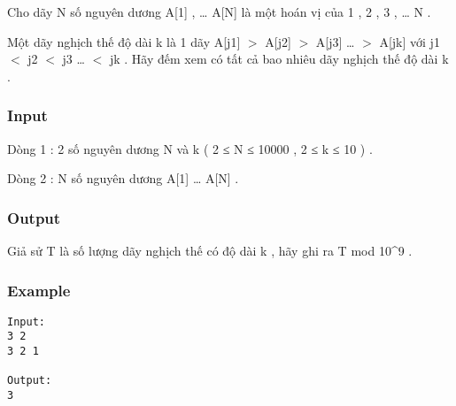 



   Cho dãy N số nguyên dương A[1] , … A[N] là một hoán vị của 1 , 2 , 3 , … N .   


   Một dãy nghịch thế độ dài k là 1 dãy A[j1] $>$ A[j2] $>$ A[j3] … $>$ A[jk] với j1 $<$ j2 $<$ j3 … $<$ jk . Hãy đếm xem có tất cả bao nhiêu dãy nghịch thế độ dài k .  

\subsubsection{   Input  }

   Dòng 1 : 2 số nguyên dương N và k ( 2 ≤ N ≤ 10000 , 2 ≤ k ≤ 10 ) .   


   Dòng 2 : N số nguyên dương A[1] … A[N] .  

\subsubsection{   Output  }

   Giả sử T là số lượng dãy nghịch thế có độ dài k , hãy ghi ra T mod 10^9 .  

\subsubsection{   Example  }
\begin{verbatim}
Input:
3 2
3 2 1

Output:
3
\end{verbatim}
